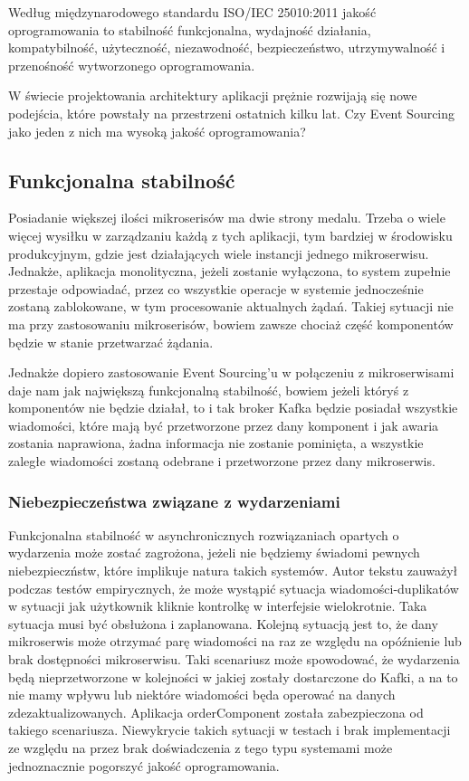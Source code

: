 Według międzynarodowego standardu ISO/IEC 25010:2011 jakość oprogramowania
to stabilność funkcjonalna, wydajność działania, kompatybilność, użyteczność, niezawodność, bezpieczeństwo, utrzymywalność i przenośność wytworzonego oprogramowania.\cite{jakoscOpr}

W świecie projektowania architektury aplikacji prężnie rozwijają się nowe podejścia, które powstały na przestrzeni ostatnich kilku lat. Czy Event Sourcing jako jeden z nich ma wysoką jakość oprogramowania? 
\subsection{Funkcjonalna stabilność}
Posiadanie większej ilości mikroserisów ma dwie strony medalu. Trzeba o wiele więcej wysiłku w zarządzaniu każdą z tych aplikacji, tym bardziej w środowisku produkcyjnym, gdzie jest działających wiele instancji jednego mikroserwisu. Jednakże, aplikacja monolityczna, jeżeli zostanie wyłączona, to system zupełnie przestaje odpowiadać, przez co wszystkie operacje w systemie jednocześnie zostaną zablokowane, w tym procesowanie aktualnych żądań. Takiej sytuacji nie ma przy zastosowaniu mikroserisów, bowiem zawsze chociaż część komponentów będzie w stanie przetwarzać żądania.

Jednakże dopiero zastosowanie Event Sourcing'u w połączeniu z mikroserwisami daje nam jak największą funkcjonalną stabilność, bowiem jeżeli któryś z komponentów nie będzie działał, to i tak broker Kafka będzie posiadał wszystkie wiadomości, które mają być przetworzone przez dany komponent i jak awaria zostania naprawiona, żadna informacja nie zostanie pominięta, a wszystkie zaległe wiadomości zostaną odebrane i przetworzone przez dany mikroserwis.

\subsubsection{Niebezpieczeństwa związane z wydarzeniami}
Funkcjonalna stabilność w asynchronicznych rozwiązaniach opartych o wydarzenia może zostać zagrożona, jeżeli nie będziemy świadomi pewnych niebezpieczństw, które implikuje natura takich systemów. Autor tekstu zauważył podczas testów empirycznych, że może wystąpić sytuacja wiadomości-duplikatów w sytuacji jak użytkownik kliknie kontrolkę w interfejsie wielokrotnie. Taka sytuacja musi być obsłużona i zaplanowana. Kolejną sytuacją jest to, że dany mikroserwis może otrzymać parę wiadomości na raz ze względu na opóźnienie lub brak dostępności mikroserwisu. Taki scenariusz może spowodować, że wydarzenia będą nieprzetworzone w kolejności w jakiej zostały dostarczone do Kafki, a na to nie mamy wpływu lub niektóre wiadomości będa operować na danych zdezaktualizowanych. Aplikacja orderComponent została zabezpieczona od takiego scenariusza. Niewykrycie takich sytuacji w testach i brak implementacji ze względu na przez brak doświadczenia z tego typu systemami może jednoznacznie pogorszyć jakość oprogramowania.

